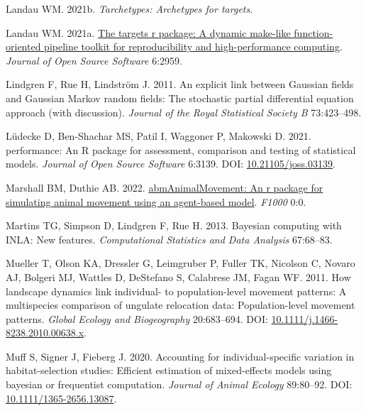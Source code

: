 \documentclass[10pt,a4paper]{article}
\newlength{\cslhangindent}
\newlength{\cslentryspacingunit} %
\newenvironment{CSLReferences}[2] %
 {%
  \setlength{\parindent}{0pt}
  \ifodd #1
  \let\oldpar\par
  \def\par{\hangindent=\cslhangindent\oldpar}
  \fi
  \setlength{\parskip}{#2\cslentryspacingunit}
 }%
 {}
\begin{document}
\begin{CSLReferences}{1}{0}
\leavevmode{}%
Landau WM. 2021b. \emph{Tarchetypes: Archetypes for targets}.

\leavevmode{}%
Landau WM. 2021a. \href{https://doi.org/10.21105/joss.02959}{The targets r package: A dynamic make-like function-oriented pipeline toolkit for reproducibility and high-performance computing}. \emph{Journal of Open Source Software} 6:2959.

\leavevmode{}%
Lindgren F, Rue H, Lindström J. 2011. An explicit link between {Gaussian} fields and {Gaussian} {Markov} random fields: The stochastic partial differential equation approach (with discussion). \emph{Journal of the Royal Statistical Society B} 73:423--498.

\leavevmode{}%
Lüdecke D, Ben-Shachar MS, Patil I, Waggoner P, Makowski D. 2021. {performance}: An {R} package for assessment, comparison and testing of statistical models. \emph{Journal of Open Source Software} 6:3139. DOI: \href{https://doi.org/10.21105/joss.03139}{10.21105/joss.03139}.

\leavevmode{}%
Marshall BM, Duthie AB. 2022. \href{https://0}{{abmAnimalMovement}: An r package for simulating animal movement using an agent-based model}. \emph{F1000} 0:0.

\leavevmode{}%
Martins TG, Simpson D, Lindgren F, Rue H. 2013. Bayesian computing with {INLA}: {N}ew features. \emph{Computational Statistics and Data Analysis} 67:68--83.

\leavevmode{}%
Mueller T, Olson KA, Dressler G, Leimgruber P, Fuller TK, Nicolson C, Novaro AJ, Bolgeri MJ, Wattles D, DeStefano S, Calabrese JM, Fagan WF. 2011. How landscape dynamics link individual- to population-level movement patterns: A multispecies comparison of ungulate relocation data: {Population}-level movement patterns. \emph{Global Ecology and Biogeography} 20:683--694. DOI: \href{https://doi.org/10.1111/j.1466-8238.2010.00638.x}{10.1111/j.1466-8238.2010.00638.x}.

\leavevmode{}%
Muff S, Signer J, Fieberg J. 2020. Accounting for individual-specific variation in habitat-selection studies: Efficient estimation of mixed-effects models using bayesian or frequentist computation. \emph{Journal of Animal Ecology} 89:80--92. DOI: \href{https://doi.org/10.1111/1365-2656.13087}{10.1111/1365-2656.13087}.


\end{CSLReferences}
\end{document}
